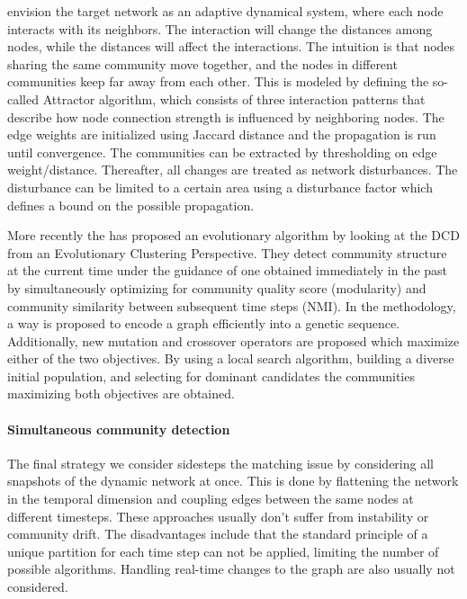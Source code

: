 \documentclass[
acmsmall,
nonacm,
screen,
acmthm]{../../scripts/pandoc/templates/acmart}
\begin{document}
\citet{guoDynamicCommunityDetection2016} envision the target network as
an adaptive dynamical system, where each node interacts with its
neighbors. The interaction will change the distances among nodes, while
the distances will affect the interactions. The intuition is that nodes
sharing the same community move together, and the nodes in different
communities keep far away from each other. This is modeled by defining
the so-called Attractor algorithm, which consists of three interaction
patterns that describe how node connection strength is influenced by
neighboring nodes. The edge weights are initialized using Jaccard
distance and the propagation is run until convergence. The communities
can be extracted by thresholding on edge weight/distance. Thereafter,
all changes are treated as network disturbances. The disturbance can be
limited to a certain area using a disturbance factor which defines a
bound on the possible propagation.

More recently the \citet{yinMultiobjectiveEvolutionaryClustering2021}
has proposed an evolutionary algorithm by looking at the DCD from an
Evolutionary Clustering Perspective. They detect community structure at
the current time under the guidance of one obtained immediately in the
past by simultaneously optimizing for community quality score
(modularity) and community similarity between subsequent time steps
(NMI). In the methodology, a way is proposed to encode a graph
efficiently into a genetic sequence. Additionally, new mutation and
crossover operators are proposed which maximize either of the two
objectives. By using a local search algorithm, building a diverse
initial population, and selecting for dominant candidates the
communities maximizing both objectives are obtained.

\hypertarget{simultaneous-community-detection}{%
\paragraph{Simultaneous community
detection}\label{simultaneous-community-detection}}

The final strategy we consider sidesteps the matching issue by
considering all snapshots of the dynamic network at once. This is done
by flattening the network in the temporal dimension and coupling edges
between the same nodes at different timesteps. These approaches usually
don't suffer from instability or community drift. The disadvantages
include that the standard principle of a unique partition for each time
step can not be applied, limiting the number of possible algorithms.
Handling real-time changes to the graph are also usually not considered.
\end{document}
